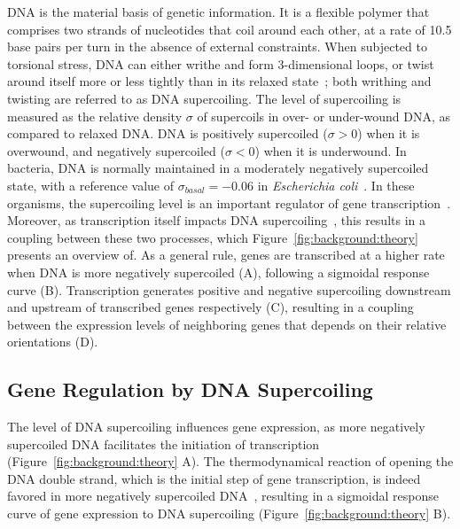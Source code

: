 DNA is the material basis of genetic information.
It is a flexible polymer that comprises two strands of nucleotides that coil around each other, at a rate of 10.5 base pairs per turn in the absence of external constraints.
When subjected to torsional stress, DNA can either writhe and form 3-dimensional loops, or twist around itself more or less tightly than in its relaxed state~\citep{travers2005}; both writhing and twisting are referred to as DNA supercoiling.
The level of supercoiling is measured as the relative density $\sigma$ of supercoils in over- or under-wound DNA, as compared to relaxed DNA.
DNA is positively supercoiled ($\sigma > 0$) when it is overwound, and negatively supercoiled ($\sigma < 0$) when it is underwound.
In bacteria, DNA is normally maintained in a moderately negatively supercoiled state, with a reference value of $\sigma_{basal}=-0.06$ in \emph{Escherichia coli}~\citep{travers2005}.
In these organisms, the supercoiling level is an important regulator of gene transcription~\citep{dorman2016}.
Moreover, as transcription itself impacts DNA supercoiling~\citep{liu1987}, this results in a coupling between these two processes, which Figure~\ref{fig:background:theory} presents an overview of.
As a general rule, genes are transcribed at a higher rate when DNA is more negatively supercoiled (A), following a sigmoidal response curve (B).
Transcription generates positive and negative supercoiling downstream and upstream of transcribed genes respectively (C), resulting in a coupling between the expression levels of neighboring genes that depends on their relative orientations (D).

\subsection{Gene Regulation by DNA Supercoiling}

The level of DNA supercoiling influences gene expression, as more negatively supercoiled DNA facilitates the initiation of transcription (Figure~\ref{fig:background:theory} A).
The thermodynamical reaction of opening the DNA double strand, which is the initial step of gene transcription, is indeed favored in more negatively supercoiled DNA~\citep{elhoudaigui2019}, resulting in a sigmoidal response curve of gene expression to DNA supercoiling (Figure~\ref{fig:background:theory} B).

